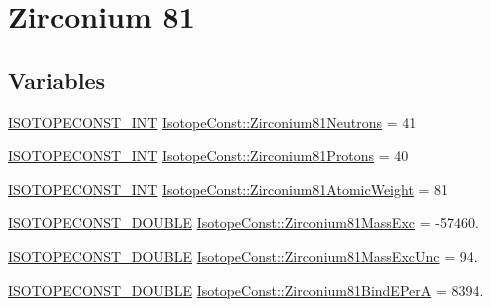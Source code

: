 \hypertarget{group___isotope_const-_zirconium-_zr81}{}\section{Zirconium 81}
\label{group___isotope_const-_zirconium-_zr81}
\subsection*{Variables}
\begin{DoxyCompactItemize}
\item 
\mbox{\hyperlink{group___isotope_const-_macros_ga5f18360b3e99483a35c32d789e62621c}{I\+S\+O\+T\+O\+P\+E\+C\+O\+N\+S\+T\+\_\+\+I\+NT}} \mbox{\hyperlink{group___isotope_const-_zirconium-_zr81_ga2a5a63eb3844c9deb9c81908173655fb}{Isotope\+Const\+::\+Zirconium81\+Neutrons}} = 41
\item 
\mbox{\hyperlink{group___isotope_const-_macros_ga5f18360b3e99483a35c32d789e62621c}{I\+S\+O\+T\+O\+P\+E\+C\+O\+N\+S\+T\+\_\+\+I\+NT}} \mbox{\hyperlink{group___isotope_const-_zirconium-_zr81_ga01cccd4a427f9da628d40f61dea578a7}{Isotope\+Const\+::\+Zirconium81\+Protons}} = 40
\item 
\mbox{\hyperlink{group___isotope_const-_macros_ga5f18360b3e99483a35c32d789e62621c}{I\+S\+O\+T\+O\+P\+E\+C\+O\+N\+S\+T\+\_\+\+I\+NT}} \mbox{\hyperlink{group___isotope_const-_zirconium-_zr81_ga1288d7322ccb181bd0b09d883ac37a4d}{Isotope\+Const\+::\+Zirconium81\+Atomic\+Weight}} = 81
\item 
\mbox{\hyperlink{group___isotope_const-_macros_ga8f45a7272ce02c0b4c65c44636ed719a}{I\+S\+O\+T\+O\+P\+E\+C\+O\+N\+S\+T\+\_\+\+D\+O\+U\+B\+LE}} \mbox{\hyperlink{group___isotope_const-_zirconium-_zr81_ga99e5ec06df90ff0ded5b7ec8d5d2eb22}{Isotope\+Const\+::\+Zirconium81\+Mass\+Exc}} = -\/57460.
\item 
\mbox{\hyperlink{group___isotope_const-_macros_ga8f45a7272ce02c0b4c65c44636ed719a}{I\+S\+O\+T\+O\+P\+E\+C\+O\+N\+S\+T\+\_\+\+D\+O\+U\+B\+LE}} \mbox{\hyperlink{group___isotope_const-_zirconium-_zr81_gae85a3190ffc116c2e2f75152c305fd6a}{Isotope\+Const\+::\+Zirconium81\+Mass\+Exc\+Unc}} = 94.
\item 
\mbox{\hyperlink{group___isotope_const-_macros_ga8f45a7272ce02c0b4c65c44636ed719a}{I\+S\+O\+T\+O\+P\+E\+C\+O\+N\+S\+T\+\_\+\+D\+O\+U\+B\+LE}} \mbox{\hyperlink{group___isotope_const-_zirconium-_zr81_gac49efe1f4be0abf13103f1ba86bf77c1}{Isotope\+Const\+::\+Zirconium81\+Bind\+E\+PerA}} = 8394.
\item 

\end{DoxyCompactItemize}
